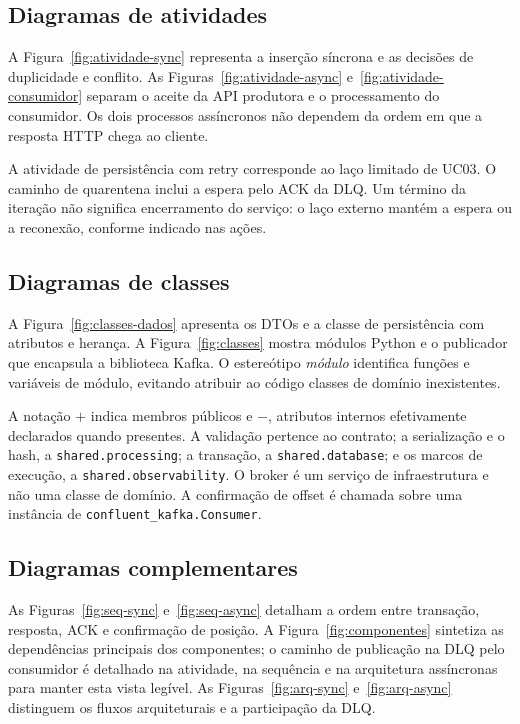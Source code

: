 \subsection{Diagramas de atividades}
A Figura~\ref{fig:atividade-sync} representa a inserção síncrona e as decisões de duplicidade e conflito. As Figuras~\ref{fig:atividade-async} e~\ref{fig:atividade-consumidor} separam o aceite da API produtora e o processamento do consumidor. Os dois processos assíncronos não dependem da ordem em que a resposta HTTP chega ao cliente.


A atividade de persistência com retry corresponde ao laço limitado de UC03. O caminho de quarentena inclui a espera pelo ACK da DLQ. Um término da iteração não significa encerramento do serviço: o laço externo mantém a espera ou a reconexão, conforme indicado nas ações.

\FloatBarrier
\subsection{Diagramas de classes}
A Figura~\ref{fig:classes-dados} apresenta os DTOs e a classe de persistência com atributos e herança. A Figura~\ref{fig:classes} mostra módulos Python e o publicador que encapsula a biblioteca Kafka. O estereótipo \textit{módulo} identifica funções e variáveis de módulo, evitando atribuir ao código classes de domínio inexistentes.


A notação \(+\) indica membros públicos e \(-\), atributos internos efetivamente declarados quando presentes. A validação pertence ao contrato; a serialização e o hash, a \texttt{shared.processing}; a transação, a \texttt{shared.database}; e os marcos de execução, a \texttt{shared.observability}. O broker é um serviço de infraestrutura e não uma classe de domínio. A confirmação de offset é chamada sobre uma instância de \texttt{confluent\_kafka.Consumer}.

\FloatBarrier
\subsection{Diagramas complementares}
As Figuras~\ref{fig:seq-sync} e~\ref{fig:seq-async} detalham a ordem entre transação, resposta, ACK e confirmação de posição. A Figura~\ref{fig:componentes} sintetiza as dependências principais dos componentes; o caminho de publicação na DLQ pelo consumidor é detalhado na atividade, na sequência e na arquitetura assíncronas para manter esta vista legível. As Figuras~\ref{fig:arq-sync} e~\ref{fig:arq-async} distinguem os fluxos arquiteturais e a participação da DLQ.

